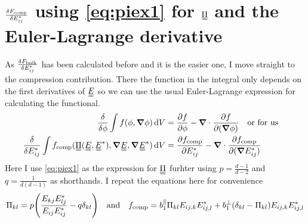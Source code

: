 \documentclass{article}
\newcommand\barbelow[1]{\stackunder[1.2pt]{$#1$}{\rule{1.5ex}{.1ex}}}
\newcommand{\du}[1]{\barbelow{\barbelow{#1}}}
\newcommand{\YY}[3][j]{E_{#2#1}E_{#3#1}^*}
\begin{document}
\section{$\fdv{F_\text{comp}}{E_{ij}^*}$ using \cref{eq:piex1} for $\du{\Pi}$ and the Euler-Lagrange derivative}
As $\fdv{F_\text{bulk}}{E_{ij}^*}$ has been calculated before and it is the easier one, I move straight to the compression contribution. There the function in the integral only depends on the first derivatives of $\du{E}$ so we can use the usual Euler-Lagrange expression for calculating the functional.
\begin{align}
    \fdv{\phi}\int f(\phi, \grad \phi) \dd{V} &= \pdv{f}{\phi} - \grad \cdot \pdv{f}{(\grad \phi)} \qq{or for us} \\
    \fdv{E_{ij}^*}\int f_\text{comp}(\du{\Pi}(\du{E}, \du{E}^*), \grad \du{E}, \grad \du{E}^*) \dd{V} &= \pdv{f_\text{comp}}{E_{ij}^*} - \grad \cdot \pdv{f_\text{comp}}{(\grad E_{ij}^*)} \label{eq:eulag}
\end{align}
Here I use \cref{eq:piex1} as the expression for $\du{\Pi}$ furhter using $p = \frac{d-1}{d-2}$ and $q = \frac{1}{d(d-1)}$ as shorthands.
I repeat the equations here for convenience
\begin{equation}
    \Pi_{kl} = p\qty(\frac{\YY{k}{l}}{\YY{i}{i}} - q \delta_{kl}) \qq{and} f_\text{comp} = b_1^\parallel \Pi_{kl} E_{ij,k}E_{ij,l}^* + b_1^\perp (\delta_{kl} - \Pi_{kl}) E_{ij,k}E_{ij,l}^*
\end{equation}
\end{document}
